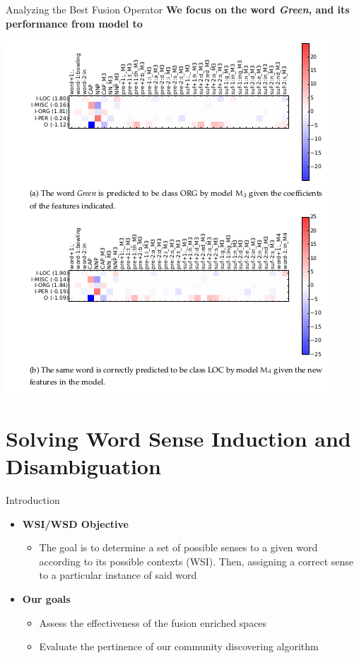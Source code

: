 \documentclass[10pt,=table]{beamer}
\newcommand*\circled[1]{\tikz[baseline=(char.base)]{
            \node[shape=circle,draw,inner sep=1pt] (char) {#1};}}
\begin{document}
\begin{frame}{Analyzing the Best Fusion Operator}
\large \textbf{We focus on the word \textit{Green}, and its performance from model \circled{$M_3$} to \circled{$M_4$}}
\begin{center}
\includegraphics[width=0.6\linewidth]{image2/Chapitre4/fanalm3_m4.png}
\end{center}
\end{frame}

\section[Applications to NLP]{Solving Word Sense Induction and Disambiguation}

\begin{frame}{Introduction}
\begin{itemize}
\item<1-> \large \textbf{WSI/WSD Objective}
\begin{itemize}
\item<1->  The goal is to determine a set of possible senses to a given word according to its possible contexts (WSI). Then, assigning a correct sense to a particular instance of said word

\end{itemize}
\item<2-> \large \textbf{Our goals}
\begin{itemize}
\item<2-> Assess the effectiveness of the fusion enriched spaces
\item<2-> Evaluate the pertinence of our community discovering algorithm
\end{itemize}

\end{itemize}
\end{frame}
\end{document}

